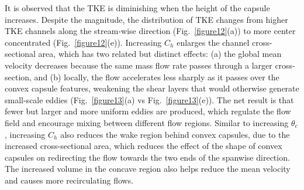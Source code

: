 \documentclass[review,12pt]{elsarticle}
\begin{document}
It is observed that the TKE is diminishing when the height of the capsule increases. Despite the magnitude, the distribution of TKE changes from higher TKE channels along the stream-wise direction (Fig.~\ref{figure12}(a)) to more center concentrated (Fig.~\ref{figure12}(e)). Increasing $C_h$ enlarges the channel cross-sectional area, which has two related but distinct effects: (a) the global mean velocity decreases because the same mass flow rate passes through a larger cross-section, and (b) locally, the flow accelerates less sharply as it passes over the convex capsule features, weakening the shear layers that would otherwise generate small-scale eddies (Fig.~\ref{figure13}(a) vs Fig.~\ref{figure13}(e)). The net result is that fewer but larger and more uniform eddies are produced, which regulate the flow field and encourage mixing between different flow regions. Similar to increasing $\theta_c$, increasing $C_h$ also reduces the wake region behind convex capsules, due to the increased cross-sectional area, which reduces the effect of the shape of convex capsules on redirecting the flow towards the two ends of the spanwise direction. The increased volume in the concave region also helps reduce the mean velocity and causes more recirculating flows.
\end{document}

